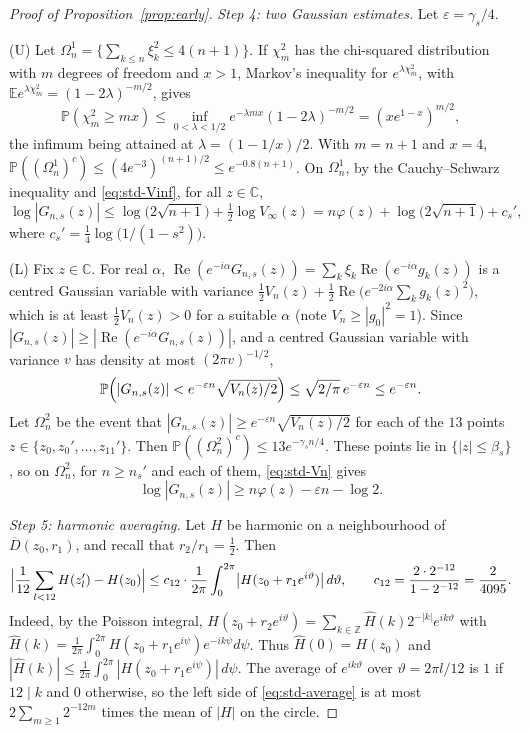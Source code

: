 \documentclass[11pt]{amsart}
\theoremstyle{definition}
\theoremstyle{remark}
\numberwithin{equation}{section}
\newcommand{\C}{\mathbb{C}}
\newcommand{\E}{\mathbb{E}}
\newcommand{\PP}{\mathbb{P}}
\newcommand{\eps}{\varepsilon}
\DeclareMathOperator{\re}{Re}
\begin{document}
\begin{proof}[Proof of Proposition~\ref{prop:early}]
\emph{Step 4: two Gaussian estimates.} Let $\eps=\gamma_s/4$.

(U) Let $\Omega_n^1=\{\sum_{k\le n}\xi_k^2\le4(n+1)\}$. If $\chi^2_m$ has the chi-squared distribution with $m$ degrees of freedom and $x>1$, Markov's inequality for $e^{\lambda\chi^2_m}$, with $\E e^{\lambda\chi^2_m}=(1-2\lambda)^{-m/2}$, gives
\[
\PP(\chi^2_m\ge mx)\le\inf_{0<\lambda<1/2}e^{-\lambda mx}(1-2\lambda)^{-m/2}=(xe^{1-x})^{m/2},
\]
the infimum being attained at $\lambda=(1-1/x)/2$. With $m=n+1$ and $x=4$, $\PP((\Omega_n^1)^c)\le(4e^{-3})^{(n+1)/2}\le e^{-0.8(n+1)}$. On $\Omega_n^1$, by the Cauchy--Schwarz inequality and \eqref{eq:std-Vinf}, for all $z\in\C$,
\begin{equation}\label{eq:std-upper}
\log|G_{n,s}(z)|\le\log\bigl(2\sqrt{n+1}\bigr)+\tfrac12\log V_\infty(z)=n\varphi(z)+\log\bigl(2\sqrt{n+1}\bigr)+c_s',
\end{equation}
where $c_s'=\frac14\log\bigl(1/(1-s^2)\bigr)$.

(L) Fix $z\in\C$. For real $\alpha$, $\re(e^{-i\alpha}G_{n,s}(z))=\sum_k\xi_k\re(e^{-i\alpha}g_k(z))$ is a centred Gaussian variable with variance $\frac12V_n(z)+\frac12\re\bigl(e^{-2i\alpha}\sum_kg_k(z)^2\bigr)$, which is at least $\frac12V_n(z)>0$ for a suitable $\alpha$ (note $V_n\ge|g_0|^2=1$). Since $|G_{n,s}(z)|\ge|\re(e^{-i\alpha}G_{n,s}(z))|$, and a centred Gaussian variable with variance $v$ has density at most $(2\pi v)^{-1/2}$,
\[
\PP\Bigl(|G_{n,s}(z)|<e^{-\eps n}\sqrt{V_n(z)/2}\Bigr)\le\sqrt{2/\pi}\,e^{-\eps n}\le e^{-\eps n}.
\]
Let $\Omega_n^2$ be the event that $|G_{n,s}(z)|\ge e^{-\eps n}\sqrt{V_n(z)/2}$ for each of the $13$ points $z\in\{z_0,z_0',\dots,z_{11}'\}$. Then $\PP((\Omega_n^2)^c)\le13e^{-\gamma_sn/4}$. These points lie in $\{|z|\le\beta_s\}$, so on $\Omega_n^2$, for $n\ge n_s'$ and each of them, \eqref{eq:std-Vn} gives
\begin{equation}\label{eq:std-lower}
\log|G_{n,s}(z)|\ge n\varphi(z)-\eps n-\log2 .
\end{equation}

\emph{Step 5: harmonic averaging.} Let $H$ be harmonic on a neighbourhood of $\overline D(z_0,r_1)$, and recall that $r_2/r_1=\frac12$. Then
\begin{equation}\label{eq:std-average}
\Bigl|\frac1{12}\sum_{l<12}H(z_l')-H(z_0)\Bigr|\le c_{12}\cdot\frac1{2\pi}\int_0^{2\pi}\bigl|H(z_0+r_1e^{i\vartheta})\bigr|\,d\vartheta,\qquad c_{12}=\frac{2\cdot2^{-12}}{1-2^{-12}}=\frac2{4095}.
\end{equation}
Indeed, by the Poisson integral, $H(z_0+r_2e^{i\vartheta})=\sum_{k\in\mathbb Z}\widehat H(k)2^{-|k|}e^{ik\vartheta}$ with $\widehat H(k)=\frac1{2\pi}\int_0^{2\pi}H(z_0+r_1e^{i\psi})e^{-ik\psi}d\psi$. Thus $\widehat H(0)=H(z_0)$ and $|\widehat H(k)|\le\frac1{2\pi}\int_0^{2\pi}|H(z_0+r_1e^{i\psi})|\,d\psi$. The average of $e^{ik\vartheta}$ over $\vartheta=2\pi l/12$ is $1$ if $12\mid k$ and $0$ otherwise, so the left side of \eqref{eq:std-average} is at most $2\sum_{m\ge1}2^{-12m}$ times the mean of $|H|$ on the circle.


\end{proof}
\end{document}
